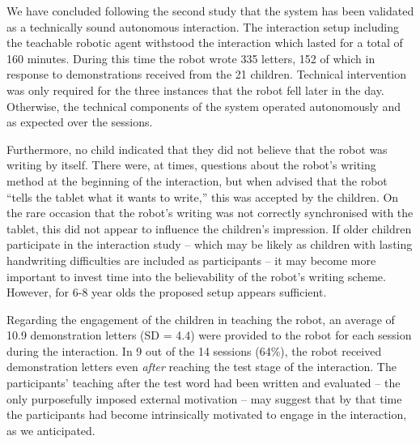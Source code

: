 \documentclass{sig-alternate}
\begin{document}

We have concluded following the second study that the system has been validated
as a technically sound autonomous interaction.  The interaction setup including
the teachable robotic agent withstood the interaction which lasted for a total
of 160 minutes.  During this time the robot wrote 335 letters, 152 of which in
response to demonstrations received from the 21 children. Technical intervention
was only required for the three instances that the robot fell later in the day.
Otherwise, the technical components of the system operated autonomously and as
expected over the sessions.

Furthermore, no child indicated that they did not believe that the robot was
writing by itself. There were, at times, questions about the robot's writing
method at the beginning of the interaction, but when advised that the robot
``tells the tablet what it wants to write,'' this was accepted by the children. 
On the rare occasion that the robot's writing was not correctly synchronised
with the tablet, this did not appear to influence the children's impression.
If older children participate in the interaction study -- which may be
likely as children with lasting handwriting difficulties are included as
participants -- it may become more important to invest time into the
believability of the robot's writing scheme. However, for 6-8 year olds the
proposed setup appears sufficient.

Regarding the engagement of the children in teaching the robot, an average of
10.9 demonstration letters (SD = 4.4) were provided to the robot for each
session during the interaction.  In 9 out of the 14 sessions (64\%), the robot
received demonstration letters even \emph{after} reaching the test stage of the
interaction. The participants' teaching after the test word had been written and
evaluated -- the only purposefully imposed external motivation -- may suggest
that by that time the participants had become intrinsically motivated to engage
in the interaction, as we anticipated.
\end{document}
